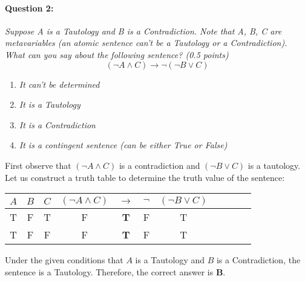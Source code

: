 \documentclass[letterpaper,11pt]{article}
\theoremstyle{mytheor}
\begin{document}
\paragraph{Question 2:} \textit{Suppose A is a Tautology and B is a Contradiction. Note that A, B, C are metavariables (an atomic sentence can’t be a Tautology or a Contradiction). What can you say about the following sentence? (0.5 points)}
\begin{equation*}
    (\neg A \land C) \rightarrow \neg (\neg B \lor C)
\end{equation*}
\begin{enumerate}[label=\textit{\Alph*:}]
    \item \textit{It can't be determined}
    \item \textit{It is a Tautology}
    \item \textit{It is a Contradiction}
    \item \textit{It is a contingent sentence (can be either True or False)}
\end{enumerate}
First observe that $(\neg A \land C)$ is a contradiction and $(\neg B \lor C)$ is a tautology. Let us construct a truth table to determine the truth value of the sentence:
\begin{table}[h]
    \centering
    \begin{tabular}{c c c | c c c c c c c c}
        \toprule
        $A$ & $B$ & $C$ & $(\neg A \land C)$ & $\rightarrow$ & $\neg$ & $(\neg B \lor C)$ \\
        \midrule
        T & F & T & F & \textbf{T} & F & T \\
        T & F & F & F & \textbf{T} & F & T \\
        \bottomrule
    \end{tabular}
\end{table}
\begin{framed}
Under the given conditions that $A$ is a Tautology and $B$ is a Contradiction, the sentence is a Tautology. Therefore, the correct answer is \textbf{B}.
\end{framed}
\end{document}
